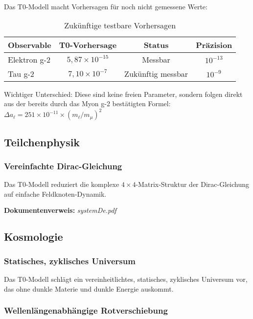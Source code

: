 \documentclass[12pt,a4paper]{article}
\begin{document}
	Das T0-Modell macht Vorhersagen für noch nicht gemessene Werte:
	
	\begin{table}[h]
		\centering
		\begin{tabular}{lccc}
			\toprule
			\textbf{Observable} & \textbf{T0-Vorhersage} & \textbf{Status} & \textbf{Präzision} \\
			\midrule
			Elektron g-2 & $5,87 \times 10^{-15}$ & Messbar & $10^{-13}$ \\
			Tau g-2 & $7,10 \times 10^{-7}$ & Zukünftig messbar & $10^{-9}$ \\
			\bottomrule
		\end{tabular}
		\caption{Zukünftige testbare Vorhersagen}
	\end{table}
	
	Wichtiger Unterschied: Diese sind keine freien Parameter, sondern folgen direkt aus der bereits durch das Myon g-2 bestätigten Formel: $\Delta a_\ell = 251 \times 10^{-11} \times (m_\ell/m_\mu)^2$
	
	\subsection{Teilchenphysik}
	
	\subsubsection{Vereinfachte Dirac-Gleichung}
	
	Das T0-Modell reduziert die komplexe $4 \times 4$-Matrix-Struktur der Dirac-Gleichung auf einfache Feldknoten-Dynamik.
	
	\textbf{Dokumentenverweis:} \textit{systemDe.pdf}
	
	\subsection{Kosmologie}
	
	\subsubsection{Statisches, zyklisches Universum}
	
	Das T0-Modell schlägt ein vereinheitlichtes, statisches, zyklisches Universum vor, das ohne dunkle Materie und dunkle Energie auskommt.
	
	\subsubsection{Wellenlängenabhängige Rotverschiebung}
	
\end{document}
